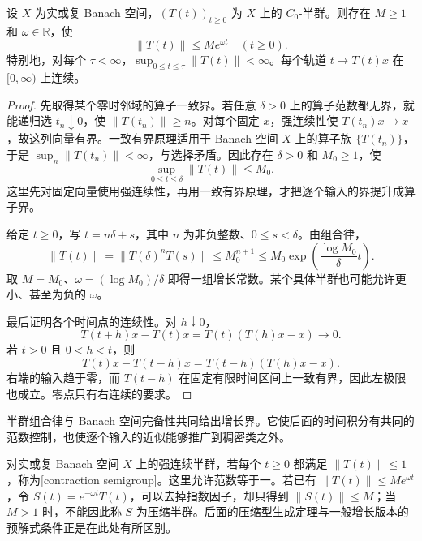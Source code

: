 \begin{proposition}[局部一致界与指数增长]\label{b2:prop:D-growth}
设 \(X\) 为实或复 Banach 空间，\((T(t))_{t\geq0}\) 为 \(X\) 上的 \(C_0\)-半群。则存在 \(M\geq1\) 和 \(\omega\in\mathbb R\)，使
\[
 \|T(t)\|\leq Me^{\omega t}\quad(t\geq0).
\]
特别地，对每个 \(\tau<\infty\)，\(\sup_{0\leq t\leq\tau}\|T(t)\|<\infty\)。每个轨道 \(t\mapsto T(t)x\) 在 \([0,\infty)\) 上连续。
\end{proposition}
\begin{proof}
先取得某个零时邻域的算子一致界。若任意 \(\delta>0\) 上的算子范数都无界，就能递归选 \(t_n\downarrow0\)，使 \(\|T(t_n)\|\geq n\)。对每个固定 \(x\)，强连续性使 \(T(t_n)x\to x\)，故这列向量有界。一致有界原理适用于 Banach 空间 \(X\) 上的算子族 \(\{T(t_n)\}\)，于是 \(\sup_n\|T(t_n)\|<\infty\)，与选择矛盾。因此存在 \(\delta>0\) 和 \(M_0\geq1\)，使
\[
 \sup_{0\leq t\leq\delta}\|T(t)\|\leq M_0.
\]
这里先对固定向量使用强连续性，再用一致有界原理，才把逐个输入的界提升成算子界。

给定 \(t\geq0\)，写 \(t=n\delta+s\)，其中 \(n\) 为非负整数、\(0\leq s<\delta\)。由组合律，
\[
 \|T(t)\|=\|T(\delta)^nT(s)\|
 \leq M_0^{n+1}
 \leq M_0\exp\left(\frac{\log M_0}{\delta}t\right).
\]
取 \(M=M_0\)、\(\omega=(\log M_0)/\delta\) 即得一组增长常数。某个具体半群也可能允许更小、甚至为负的 \(\omega\)。

最后证明各个时间点的连续性。对 \(h\downarrow0\)，
\[
 T(t+h)x-T(t)x=T(t)(T(h)x-x)\longrightarrow0.
\]
若 \(t>0\) 且 \(0<h<t\)，则
\[
 T(t)x-T(t-h)x=T(t-h)(T(h)x-x).
\]
右端的输入趋于零，而 \(T(t-h)\) 在固定有限时间区间上一致有界，因此左极限也成立。零点只有右连续的要求。
\end{proof}
半群组合律与 Banach 空间完备性共同给出增长界。它使后面的时间积分有共同的范数控制，也使逐个输入的近似能够推广到稠密类之外。

\ProseParagraphBreak

对实或复 Banach 空间 \(X\) 上的强连续半群，若每个 \(t\geq0\) 都满足 \(\|T(t)\|\leq1\)，称为[contraction semigroup]。这里允许范数等于一。若已有 \(\|T(t)\|\leq Me^{\omega t}\)，令 \(S(t)=e^{-\omega t}T(t)\)，可以去掉指数因子，却只得到 \(\|S(t)\|\leq M\)；当 \(M>1\) 时，不能因此称 \(S\) 为压缩半群。后面的压缩型生成定理与一般增长版本的预解式条件正是在此处有所区别。

\ProseParagraphBreak

